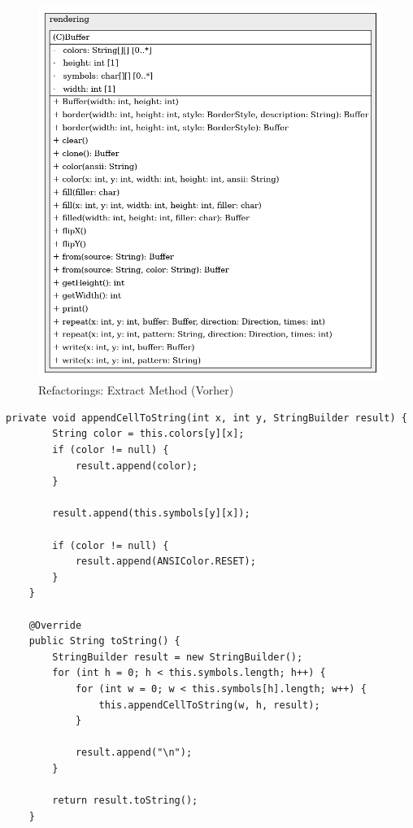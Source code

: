 \vspace{0.5cm}
\begin{figure}[H]
    \centering
    \includegraphics[width=0.6\linewidth]{Bilder/Visualisierung/BufferBeforeRefactor_structure.png}
    \caption{Refactorings: Extract Method (Vorher)}
\end{figure}

\vspace{0.5cm}
\begin{lstlisting}[caption={Refactorings: Extract Method (Nachher)}]
    private void appendCellToString(int x, int y, StringBuilder result) {
        String color = this.colors[y][x];
        if (color != null) {
            result.append(color);
        }
        
        result.append(this.symbols[y][x]);
        
        if (color != null) {
            result.append(ANSIColor.RESET);
        }
    }
    
    @Override
    public String toString() {
        StringBuilder result = new StringBuilder();
        for (int h = 0; h < this.symbols.length; h++) {
            for (int w = 0; w < this.symbols[h].length; w++) {
                this.appendCellToString(w, h, result);
            }
            
            result.append("\n");
        }
        
        return result.toString();
    }
\end{lstlisting}


